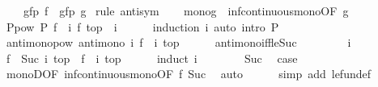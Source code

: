 \begin{isabellebody}
\ \ \ {\isachardoublequoteopen}{\isasymalpha}\ {\isacharparenleft}gfp\ f{\isacharparenright}\ {\isacharequal}\ gfp\ g{\isachardoublequoteclose}\isanewline
%
\isadelimproof
%
\endisadelimproof
%
\isatagproof
{}\isamarkupfalse%
\ {\isacharparenleft}rule\ antisym{\isacharparenright}\isanewline
\ \ \isamarkupfalse%
\ mono{\isacharunderscore}g\ {\isacharequal}\ inf{\isacharunderscore}continuous{\isacharunderscore}mono{\isacharbrackleft}OF\ g{\isacharbrackright}\isanewline
\isanewline
\ \ \isamarkupfalse%
\ P{\isacharunderscore}pow{\isacharcolon}\ {\isachardoublequoteopen}P\ {\isacharparenleft}{\isacharparenleft}f\ {\isacharcircum}{\isacharcircum}\ i{\isacharparenright}\ {\isacharparenleft}f\ top{\isacharparenright}{\isacharparenright}{\isachardoublequoteclose}\ \ i\isanewline
\ \ \ \ \isamarkupfalse%
\ {\isacharparenleft}induction\ i{\isacharparenright}\ {\isacharparenleft}auto\ intro{\isacharbang}{\isacharcolon}\ P{\isacharparenright}\isanewline
\isanewline
\ \ \isamarkupfalse%
\ antimono{\isacharunderscore}pow{\isacharcolon}\ {\isachardoublequoteopen}antimono\ {\isacharparenleft}{\isasymlambda}i{\isachardot}\ {\isacharparenleft}f\ {\isacharcircum}{\isacharcircum}\ i{\isacharparenright}\ top{\isacharparenright}{\isachardoublequoteclose}\isanewline
\ \ \ \ \isamarkupfalse%
\ antimono{\isacharunderscore}iff{\isacharunderscore}le{\isacharunderscore}Suc\isanewline
\ \ \isamarkupfalse%
\isanewline
\ \ \ \ \isamarkupfalse%
\ i\ \isamarkupfalse%
\ {\isachardoublequoteopen}{\isacharparenleft}f\ {\isacharcircum}{\isacharcircum}\ Suc\ i{\isacharparenright}\ top\ {\isasymle}\ {\isacharparenleft}f\ {\isacharcircum}{\isacharcircum}\ i{\isacharparenright}\ top{\isachardoublequoteclose}\isanewline
\ \ \ \ \isamarkupfalse%
\ {\isacharparenleft}induct\ i{\isacharparenright}\isanewline
\ \ \ \ \ \ \isamarkupfalse%
\ Suc\ \isamarkupfalse%
\ {\isacharquery}case\ \isamarkupfalse%
\ monoD{\isacharbrackleft}OF\ inf{\isacharunderscore}continuous{\isacharunderscore}mono{\isacharbrackleft}OF\ f{\isacharbrackright}\ Suc{\isacharbrackright}\ \isamarkupfalse%
\ auto\isanewline
\ \ \ \ \isamarkupfalse%
\ {\isacharparenleft}simp\ add{\isacharcolon}\ le{\isacharunderscore}fun{\isacharunderscore}def{\isacharparenright}\isanewline
\ \ \isamarkupfalse%
\isanewline
\ \ \isamarkupfalse%

\end{isabellebody}

